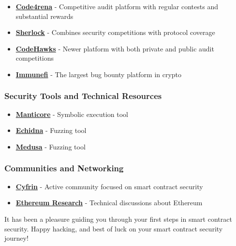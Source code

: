 \documentclass[12pt]{article}
\begin{document}
\begin{itemize}
    \item \textbf{\href{https://code4rena.com/}{Code4rena}} - Competitive audit platform with regular contests and substantial rewards
    \item \textbf{\href{https://www.sherlock.xyz/}{Sherlock}} - Combines security competitions with protocol coverage
    \item \textbf{\href{https://codehawks.cyfrin.io/}{CodeHawks}} - Newer platform with both private and public audit competitions
    \item \textbf{\href{https://immunefi.com/}{Immunefi}} - The largest bug bounty platform in crypto
\end{itemize}

\subsubsection*{Security Tools and Technical Resources}

\begin{itemize}
    \item \textbf{\href{https://github.com/trailofbits/manticore}{Manticore}} - Symbolic execution tool
    \item \textbf{\href{https://github.com/crytic/echidna}{Echidna}} - Fuzzing tool
    \item \textbf{\href{https://github.com/crytic/medusa}{Medusa}} - Fuzzing tool
\end{itemize}

\subsubsection*{Communities and Networking}

\begin{itemize}
    \item \textbf{\href{https://discord.gg/cyfrin}{Cyfrin}} - Active community focused on smart contract security
    \item \textbf{\href{https://discord.gg/qGpsxSA}{Ethereum Research}} - Technical discussions about Ethereum
\end{itemize}

\noindent
It has been a pleasure guiding you through your first steps in smart contract security. Happy hacking, and best of luck on your smart contract security journey!
\end{document}
